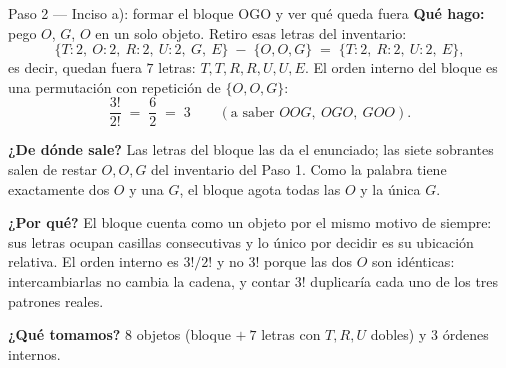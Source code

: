 \documentclass[11pt]{article}
\begin{document}
\begin{paso}{Paso 2 --- Inciso a): formar el bloque OGO y ver qué queda fuera}
\textbf{Qué hago:} pego $O$, $G$, $O$ en un solo objeto. Retiro esas letras del inventario:
\[
\{T{:}2,\ O{:}2,\ R{:}2,\ U{:}2,\ G,\ E\}\;-\;\{O,O,G\} \;=\; \{T{:}2,\ R{:}2,\ U{:}2,\ E\},
\]
es decir, quedan fuera $7$ letras: $T,T,R,R,U,U,E$. El orden interno del bloque es una permutación con
repetición de $\{O,O,G\}$:
\[
\frac{3!}{2!} \;=\; \frac{6}{2} \;=\; 3 \qquad (\text{a saber } OOG,\ OGO,\ GOO).
\]

\textbf{¿De dónde sale?} Las letras del bloque las da el enunciado; las siete sobrantes salen de restar
$O,O,G$ del inventario del Paso 1. Como la palabra tiene exactamente dos $O$ y una $G$, el bloque agota
todas las $O$ y la única $G$.

\textbf{¿Por qué?} El bloque cuenta como un objeto por el mismo motivo de siempre: sus letras ocupan casillas
consecutivas y lo único por decidir es su ubicación relativa. El orden interno es $3!/2!$ y no $3!$ porque
las dos $O$ son idénticas: intercambiarlas no cambia la cadena, y contar $3!$ duplicaría cada uno de los tres
patrones reales.

\textbf{¿Qué tomamos?} $8$ objetos (bloque $+\ 7$ letras con $T,R,U$ dobles) y $3$ órdenes internos.
\end{paso}
\end{document}
